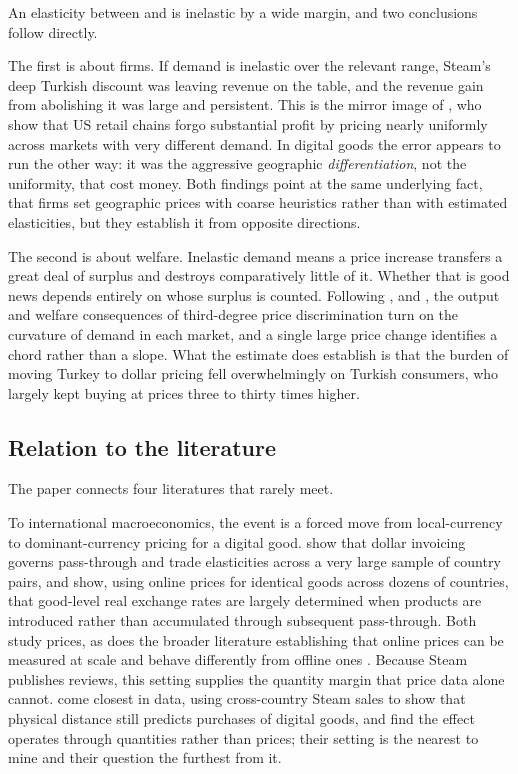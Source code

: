 \documentclass[11pt]{article}
\begin{document}
An elasticity between \epsHi{} and \bDose{} is inelastic by a wide margin, and two conclusions
follow directly.

The first is about firms. If demand is inelastic over the relevant range, Steam's deep Turkish
discount was leaving revenue on the table, and the revenue gain from abolishing it was large and
persistent. This is the mirror image of \citet{dellavigna2019}, who show that US retail chains
forgo substantial profit by pricing nearly uniformly across markets with very different demand. In
digital goods the error appears to run the other way: it was the aggressive geographic
\emph{differentiation}, not the uniformity, that cost money. Both findings point at the same
underlying fact, that firms set geographic prices with coarse heuristics rather than with
estimated elasticities, but they establish it from opposite directions.

The second is about welfare. Inelastic demand means a price increase transfers a great deal of
surplus and destroys comparatively little of it. Whether that is good news depends entirely on
whose surplus is counted. Following \citet{schmalensee1981}, \citet{varian1985} and
\citet{aguirre2010}, the output and welfare consequences of third-degree price discrimination turn
on the curvature of demand in each market, and a single large price change identifies a chord
rather than a slope. What the estimate does establish is that the burden of moving Turkey to
dollar pricing fell overwhelmingly on Turkish consumers, who largely kept buying at prices three
to thirty times higher.

\subsection*{Relation to the literature}

The paper connects four literatures that rarely meet.

To international macroeconomics, the event is a forced move from local-currency to
dominant-currency pricing for a digital good. \citet{gopinath2020} show that dollar invoicing
governs pass-through and trade elasticities across a very large sample of country pairs, and
\citet{cavallo2014} show, using online prices for identical goods across dozens of countries, that
good-level real exchange rates are largely determined when products are introduced rather than
accumulated through subsequent pass-through. Both study prices, as does the broader literature establishing that online prices can be
measured at scale and behave differently from offline ones \citep{cavallo2017,gorodnichenko2017}.
Because Steam publishes reviews, this setting supplies the quantity margin that price data alone
cannot. \citet{watabe2025} come closest in data, using cross-country Steam sales to show that
physical distance still predicts purchases of digital goods, and find the effect operates through
quantities rather than prices; their setting is the nearest to mine and their question the
furthest from it.
\end{document}
